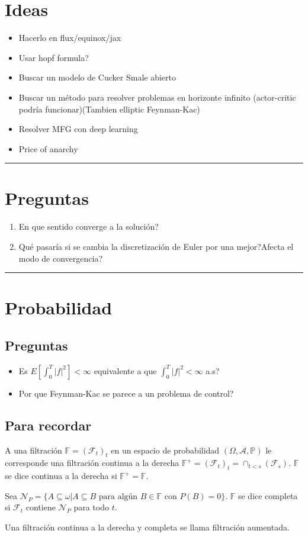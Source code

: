 \documentclass{article}
\newcommand{\HRule}{\rule{\linewidth}{0.5mm}}
\newenvironment{recordar}[1][Recordar]
{\begin{tcolorbox}[breakable,colback=red!10!white,colframe=red!50!blue,title=Recordar: #1 ,enhanced jigsaw]
	
}{\end{tcolorbox}}
\begin{document}
    \section*{Ideas}
    \begin{itemize}
    	\item Hacerlo en flux/equinox/jax
    	\item Usar hopf formula? 
    	\item Buscar un modelo de Cucker Smale abierto
    	\item Buscar un método para resolver problemas en horizonte infinito (actor-critic podría funcionar)(Tambien elliptic Feynman-Kac)
    	\item Resolver MFG con deep learning
    	\item Price of anarchy
    \end{itemize}
    \HRule\par
    \section*{Preguntas}
	\begin{enumerate}
	\item En que sentido converge a la solución?
	\item Qué pasaría si se cambia la discretización de Euler por una mejor?Afecta el modo de convergencia?
	\end{enumerate}
    \HRule\par
    \section*{Probabilidad}
    \subsection*{Preguntas}
    \begin{itemize}
    	\item Es $E[\int_{0}^{T} |f|^2]<\infty$ equivalente a que $\int_{0}^{T}|f|^2<\infty$ a.s?
    	\item Por que Feynman-Kac se parece a un problema de control?
    \end{itemize}
    \subsection*{Para recordar}
    \begin{recordar}[Filtración aumentada]
    	A una filtración $\mathbb{F}=(\mathcal{F}_t)_t$ en un espacio de probabilidad $(\Omega,\mathcal{A},\mathbb{P})$ le corresponde una filtración continua a la derecha $\mathbb{F}^+=(\mathcal{F}_t)_t=\cap_{t<s}(\mathcal{F}_s)$. $\mathbb{F}$ se dice continua a la derecha si $\mathbb{F}^+=\mathbb{F}$.
    	
    	Sea $\mathcal{N}_P=\{A\subseteq \omega | A\subseteq B \text{ para algún } B\in \mathbb{F} \text{ con } P(B)=0\}$. $\mathbb{F}$ se dice completa si $\mathcal{F}_t$ contiene $\mathcal{N}_P$ para todo $t$.
    	
    	Una filtración continua a la derecha y completa se llama filtración aumentada.
    \end{recordar}
\end{document}
